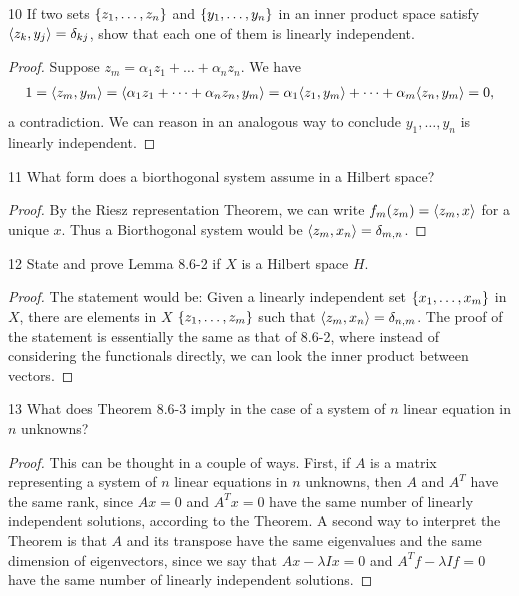 \begin{exercise}{10}
If two sets $\{z_1, \dots, z_n\}$ and $\{y_1, \dots, y_n\}$ in an inner product space satisfy $\langle z_k, y_j\rangle = \delta_{kj}$, show that each one of them is linearly independent.
\end{exercise}
\begin{proof}
Suppose $z_m = \alpha_1 z_1 + \dots + \alpha_n z_n$.
We have
\begin{align*}
    1 = \langle z_m, y_m\rangle
    = \langle \alpha_1 z_1 + \dots + \alpha_n z_n, y_m\rangle
    = \alpha_1 \langle z_1, y_m\rangle + \dots + \alpha_m \langle z_n, y_m\rangle = 0,
\end{align*}
a contradiction.
We can reason in an analogous way to conclude $y_1, \dots, y_n$ is linearly independent.
\end{proof} 

\begin{exercise}{11}
What form does a biorthogonal system assume in a Hilbert space?
\end{exercise}
\begin{proof}
By the Riesz representation Theorem, we can write $f_m(z_m) = \langle z_m, x\rangle$ for a unique $x$.
Thus a Biorthogonal system would be $\langle z_m, x_n\rangle = \delta_{m, n}$.
\end{proof} 

\begin{exercise}{12}
State and prove Lemma 8.6-2 if $X$ is a Hilbert space $H$.
\end{exercise}
\begin{proof}
The statement would be:
Given a linearly independent set $\{x_1, \dots, x_m\}$ in $X$, there are elements in $X$ $\{z_1, \dots, z_m\}$ such that $\langle z_m, x_n\rangle = \delta_{n, m}$.
The proof of the statement is essentially the same as that of 8.6-2, where instead of considering the functionals directly, we can look the inner product between vectors.
\end{proof} 

\begin{exercise}{13}
What does Theorem 8.6-3 imply in the case of a system of $n$ linear equation in $n$ unknowns?
\end{exercise}
\begin{proof}
This can be thought in a couple of ways.
First, if $A$ is a matrix representing a system of $n$ linear equations in $n$ unknowns, then $A$ and $A^T$ have the same rank, since $Ax = 0$ and $A^T x = 0$ have the same number of linearly independent solutions, according to the Theorem.
A second way to interpret the Theorem is that $A$ and its transpose have the same eigenvalues and the same dimension of eigenvectors, since we say that $Ax - \lambda Ix = 0$ and $A^T f - \lambda I f = 0$ have the same number of linearly independent solutions.
\end{proof} 

